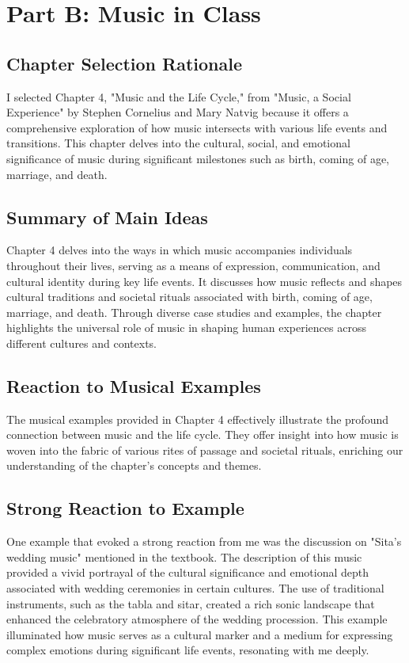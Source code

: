 
\section{Part B: Music in Class}

\subsection{Chapter Selection Rationale}

I selected Chapter 4, "Music and the Life Cycle," from "Music, a Social Experience" by Stephen Cornelius and Mary Natvig because it offers a comprehensive exploration of how music intersects with various life events and transitions. This chapter delves into the cultural, social, and emotional significance of music during significant milestones such as birth, coming of age, marriage, and death.

\subsection{Summary of Main Ideas}

Chapter 4 delves into the ways in which music accompanies individuals throughout their lives, serving as a means of expression, communication, and cultural identity during key life events. It discusses how music reflects and shapes cultural traditions and societal rituals associated with birth, coming of age, marriage, and death. Through diverse case studies and examples, the chapter highlights the universal role of music in shaping human experiences across different cultures and contexts.

\subsection{Reaction to Musical Examples}

The musical examples provided in Chapter 4 effectively illustrate the profound connection between music and the life cycle. They offer insight into how music is woven into the fabric of various rites of passage and societal rituals, enriching our understanding of the chapter's concepts and themes.

\subsection{Strong Reaction to Example}

One example that evoked a strong reaction from me was the discussion on "Sita's wedding music" mentioned in the textbook. The description of this music provided a vivid portrayal of the cultural significance and emotional depth associated with wedding ceremonies in certain cultures. The use of traditional instruments, such as the tabla and sitar, created a rich sonic landscape that enhanced the celebratory atmosphere of the wedding procession. This example illuminated how music serves as a cultural marker and a medium for expressing complex emotions during significant life events, resonating with me deeply.

